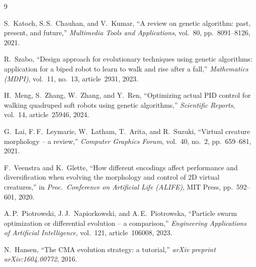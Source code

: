 \documentclass[11pt,a4paper]{article}
\begin{document}
\begin{thebibliography}{9}

S.~Katoch, S.\,S.~Chauhan, and V.~Kumar,
``A review on genetic algorithm: past, present, and future,''
\textit{Multimedia Tools and Applications}, vol.~80, pp.~8091--8126, 2021.

R.~Szabo,
``Design approach for evolutionary techniques using genetic algorithms: application for a biped robot to learn to walk and rise after a fall,''
\textit{Mathematics (MDPI)}, vol.~11, no.~13, article~2931, 2023.

H.~Meng, S.~Zhang, W.~Zhang, and Y.~Ren,
``Optimizing actual PID control for walking quadruped soft robots using genetic algorithms,''
\textit{Scientific Reports}, vol.~14, article~25946, 2024.

G.~Lai, F.\,F.~Leymarie, W.~Latham, T.~Arita, and R.~Suzuki,
``Virtual creature morphology -- a review,''
\textit{Computer Graphics Forum}, vol.~40, no.~2, pp.~659--681, 2021.

F.~Veenstra and K.~Glette,
``How different encodings affect performance and diversification when evolving the morphology and control of 2D virtual creatures,''
in \textit{Proc.\ Conference on Artificial Life (ALIFE)}, MIT Press, pp.~592--601, 2020.

A.\,P.~Piotrowski, J.\,J.~Napiorkowski, and A.\,E.~Piotrowska,
``Particle swarm optimization or differential evolution -- a comparison,''
\textit{Engineering Applications of Artificial Intelligence}, vol.~121, article~106008, 2023.

N.~Hansen,
``The CMA evolution strategy: a tutorial,''
\textit{arXiv preprint arXiv:1604.00772}, 2016.

\end{thebibliography}
\end{document}
